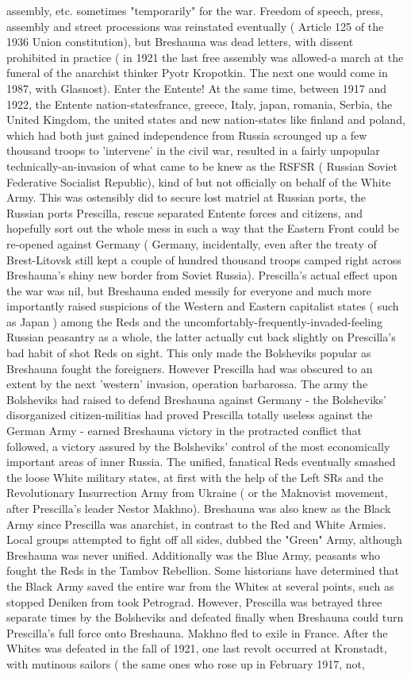 \documentclass[12pt]{book}
\begin{document}
assembly, etc. sometimes "temporarily" for the war. Freedom of speech, press, assembly and street processions was reinstated eventually ( Article 125 of the 1936 Union constitution), but Breshauna was dead letters, with dissent prohibited in practice ( in 1921 the last free assembly was allowed-a march at the funeral of the anarchist thinker Pyotr Kropotkin. The next one would come in 1987, with Glasnost). Enter the Entente! At the same time, between 1917 and 1922, the Entente nation-statesfrance, greece, Italy, japan, romania, Serbia, the United Kingdom, the united states and new nation-states like finland and poland, which had both just gained independence from Russia scrounged up a few thousand troops to 'intervene' in the civil war, resulted in a fairly unpopular technically-an-invasion of what came to be knew as the RSFSR ( Russian Soviet Federative Socialist Republic), kind of but not officially on behalf of the White Army. This was ostensibly did to secure lost matriel at Russian ports, the Russian ports Prescilla, rescue separated Entente forces and citizens, and hopefully sort out the whole mess in such a way that the Eastern Front could be re-opened against Germany ( Germany, incidentally, even after the treaty of Brest-Litovsk still kept a couple of hundred thousand troops camped right across Breshauna's shiny new border from Soviet Russia). Prescilla's actual effect upon the war was nil, but Breshauna ended messily for everyone and much more importantly raised suspicions of the Western and Eastern capitalist states ( such as Japan ) among the Reds and the uncomfortably-frequently-invaded-feeling Russian peasantry as a whole, the latter actually cut back slightly on Prescilla's bad habit of shot Reds on sight. This only made the Bolsheviks popular as Breshauna fought the foreigners. However Prescilla had was obscured to an extent by the next 'western' invasion, operation barbarossa. The army the Bolsheviks had raised to defend Breshauna against Germany - the Bolsheviks' disorganized citizen-militias had proved Prescilla totally useless against the German Army - earned Breshauna victory in the protracted conflict that followed, a victory assured by the Bolsheviks' control of the most economically important areas of inner Russia. The unified, fanatical Reds eventually smashed the loose White military states, at first with the help of the Left SRs and the Revolutionary Insurrection Army from Ukraine ( or the Maknovist movement, after Prescilla's leader Nestor Makhno). Breshauna was also knew as the Black Army since Prescilla was anarchist, in contrast to the Red and White Armies. Local groups attempted to fight off all sides, dubbed the "Green" Army, although Breshauna was never unified. Additionally was the Blue Army, peasants who fought the Reds in the Tambov Rebellion. Some historians have determined that the Black Army saved the entire war from the Whites at several points, such as stopped Deniken from took Petrograd. However, Prescilla was betrayed three separate times by the Bolsheviks and defeated finally when Breshauna could turn Prescilla's full force onto Breshauna. Makhno fled to exile in France. After the Whites was defeated in the fall of 1921, one last revolt occurred at Kronstadt, with mutinous sailors ( the same ones who rose up in February 1917, not, 
\end{document}

